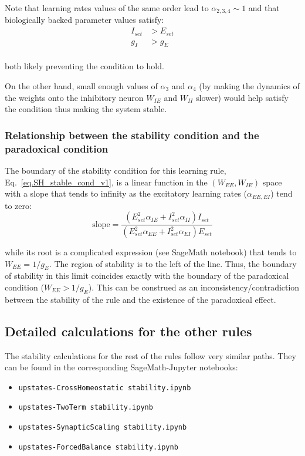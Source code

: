 \documentclass[twocolumn]{article}
\newcommand{\EE}{\mathit{EE}}
\newcommand{\EI}{\mathit{EI}}
\newcommand{\IE}{\mathit{IE}}
\newcommand{\II}{\mathit{II}}
\newcommand{\set}{\mathit{set}}
\begin{document}
Note that learning rates values of the same order lead to $\alpha_{2,3,4} \sim 1$ and that biologically backed parameter values satisfy: 
\begin{displaymath}
\begin{aligned}
I_{\set} & > E_{\set} \\
g_I & > g_E \\
\end{aligned}
\end{displaymath}

\noindent both likely preventing the condition to hold.

On the other hand, small enough values of $\alpha_3$ and $\alpha_4$ (by making the dynamics of the weights onto the inhibitory neuron $W_{\IE}$ and $W_{\II}$ slower) would help satisfy the condition thus making the system stable.




\subsubsection{Relationship between the stability condition and the paradoxical condition}

The boundary of the stability condition for this learning rule, Eq.\ \ref{eq.SH_stable_cond_v1}, is a linear function in the $(W_{\EE},W_{\IE})$ space with a slope that tends to infinity as the excitatory learning rates ($\alpha_{\EE,\EI}$) tend to zero:
\begin{displaymath}
\mbox{slope} = \frac{(E_{\set}^2 \alpha_{\IE} + I_{\set}^2\alpha_{\II})I_{\set}}{(E_{\set}^2\alpha_{\EE} + I_{\set}^2\alpha_{\EI})E_{\set}}
\end{displaymath}

\noindent while its root is a complicated expression (see SageMath notebook) that tends to $W_{\EE} = 1/g_E$. The region of stability is to the left of the line. Thus, the boundary of stability in this limit coincides exactly with the boundary of the paradoxical condition ($W_{\EE}>1/g_E$). This can be construed as an inconsistency/contradiction between the stability of the rule and the existence of the paradoxical effect.




\subsection{Detailed calculations for the other rules}
\label{sec.otherRules_details}

The stability calculations for the rest of the rules follow very similar paths. They can be found in the corresponding SageMath-Jupyter notebooks:
\begin{itemize}
\item[] {\tt upstates-CrossHomeostatic stability.ipynb}
\item[] {\tt upstates-TwoTerm stability.ipynb}
\item[] {\tt upstates-SynapticScaling stability.ipynb}
\item[] {\tt upstates-ForcedBalance stability.ipynb}
\end{itemize}
\end{document}
